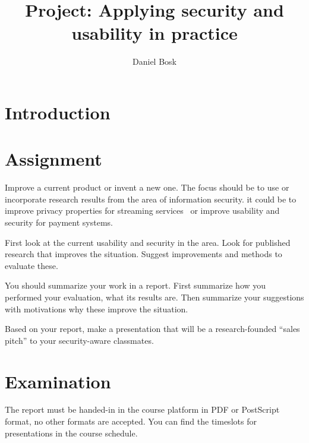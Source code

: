 \title{Project: Applying security and usability in practice}
\author{Daniel Bosk}

\maketitle

\mode*

%  

\section{Introduction}%
\label{sec:intro}




\section{Assignment}%
\label{sec:work}

Improve a current product or invent a new one.
The focus should be to use or incorporate research results from the area of 
information security.
\Eg it could be to improve privacy properties for streaming 
services~\cite[\eg][]{anonpass} or
improve usability and security for payment systems.

First look at the current usability and security in the area.
Look for published research that improves the situation.
Suggest improvements and methods to evaluate these.

You should summarize your work in a report.
First summarize how you performed your evaluation, what its results are.
Then summarize your suggestions with motivations why these improve the 
situation.

Based on your report, make a presentation that will be a research-founded 
\enquote{sales pitch} to your security-aware classmates.


\section{Examination}%
\label{sec:exam}

The report must be handed-in in the course platform in PDF or PostScript 
format, no other formats are accepted.
You can find the timeslots for presentations in the course schedule.

